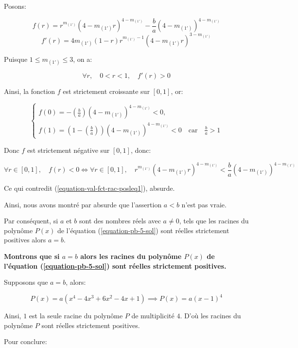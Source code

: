 \documentclass[12pt,a4paper,article]{memoir}
\begin{document}
 Posons:
 
 \[f(r) = r^{m_{(1')}}(4 - m_{(1')}r)^{4 - m_{(1')}} - \frac{b}{a}(4 - m_{(1')})^{4 - m_{(1')}}\]
 \[f'(r) = 4m_{(1')}(1 - r)r^{m_{(1')} - 1}(4 - m_{(1')}r)^{3 - m_{(1')}}\]

Puisque $1 \leq m_{(1')} \leq 3$, on a:

\[\forall r, \quad 0 < r < 1, \quad f'(r) > 0\]

Ainsi, la fonction $f$ est strictement croissante sur $[0,1]$, or: 

\[
\left\{
	\begin{array}{l}
	f(0) = -\left(\frac{b}{a}\right)(4 - m_{(1')})^{4 - m_{(1')}} < 0,\\
	f(1) = (1 - \left(\frac{b}{a}\right))(4 - m_{(1')})^{4 - m_{(1')}} < 0 \quad \textrm{car} \quad \frac{b}{a} > 1
	\end{array}
\right.
\]

Donc $f$ est strictement négative sur $[0,1]$, donc:

\[\forall r \in [0,1], \quad f(r) < 0 \Longleftrightarrow \forall r \in [0,1], \quad r^{m_{(1')}}(4 - m_{(1')}r)^{4 - m_{(1')}} < \frac{b}{a}(4 - m_{(1')})^{4 - m_{(1')}}\] 

Ce qui contredit (\ref{equation-val-fct-rac-posleq1}), absurde.

\bigskip

Ainsi, nous avons montré par absurde que l'assertion $a < b$ n'est pas vraie.

\bigskip

Par conséquent, si $a$ et $b$ sont des nombres réels avec $a \neq 0$, tels que les racines du polynôme $P(x)$ de l'équation (\ref{equation-pb-5-sol}) sont réelles strictement positives alors $a = b$.

\bigskip

\textbf{Montrons que si $a = b$ alors les racines du polynôme $P(x)$ de l'équation (\ref{equation-pb-5-sol}) sont réelles strictement positives.}

\bigskip

Supposons que $a = b$, alors:

\[P(x) = a(x^4 - 4x^3 + 6x^2 - 4x + 1) \implies P(x) = a(x - 1)^4\]

Ainsi, $1$ est la seule racine du polynôme $P$ de multiplicité $4$. D'où les racines du polynôme $P$ sont réelles strictement positives.

\bigskip

Pour conclure:

\bigskip
\end{document}
